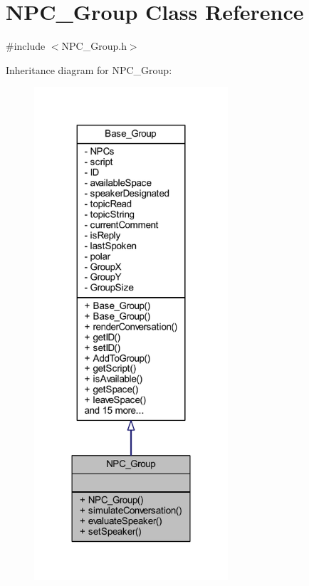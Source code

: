 \hypertarget{class_n_p_c___group}{}\section{N\+P\+C\+\_\+\+Group Class Reference}
\label{class_n_p_c___group}


{\ttfamily \#include $<$N\+P\+C\+\_\+\+Group.\+h$>$}



Inheritance diagram for N\+P\+C\+\_\+\+Group\+:\nopagebreak
\begin{figure}[H]
\begin{center}
\leavevmode
\includegraphics[width=204pt]{class_n_p_c___group__inherit__graph}
\end{center}
\end{figure}


